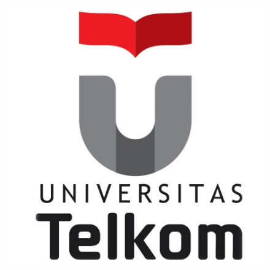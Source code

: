 \begin{titlepage}
\begin{center}
        \begin{figure}
            \begin{center}
                \includegraphics[scale=1]{pics/Untel.jpg}
            \end{center}
        \end{figure}
        \vspace*{1.0cm}
    \end{center}
\end{titlepage}
